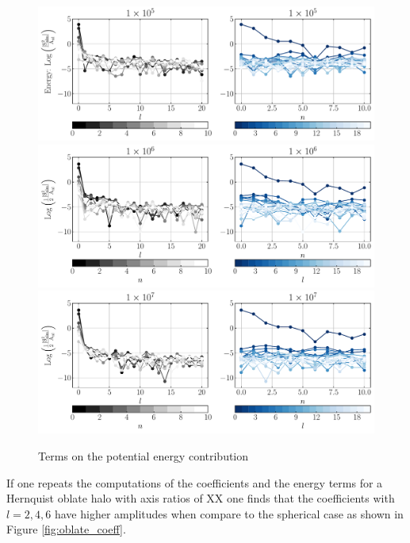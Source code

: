 \documentclass[14pt]{article}
\begin{document}
\begin{figure}[H]
  \centering
  \includegraphics[scale=0.5]{../code/energy_terms_hern_a_40_1E5.pdf}
  \includegraphics[scale=0.5]{../code/energy_terms_hern_a_40_1E6.pdf}
  \includegraphics[scale=0.5]{../code/energy_terms_hern_a_40_1E7.pdf}
  \caption{Terms on the potential energy contribution}
\end{figure}


If one repeats the computations of the coefficients and the energy terms for a
Hernquist oblate halo with axis ratios of XX one finds that the coefficients
with $l=2,4,6$ have higher amplitudes when compare to the spherical case as shown
in Figure \ref{fig:oblate_coeff}. 
\end{document}
